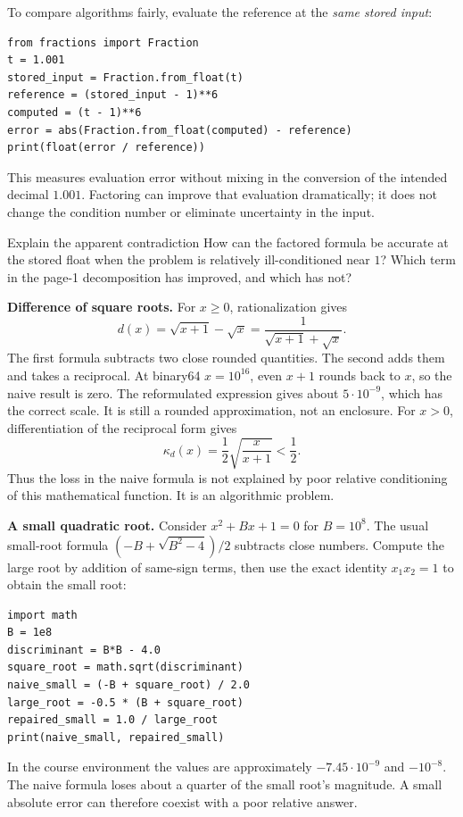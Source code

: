 To compare algorithms fairly, evaluate the reference at the \emph{same stored input}:
\begin{lstlisting}
from fractions import Fraction
t = 1.001
stored_input = Fraction.from_float(t)
reference = (stored_input - 1)**6
computed = (t - 1)**6
error = abs(Fraction.from_float(computed) - reference)
print(float(error / reference))
\end{lstlisting}
This measures evaluation error without mixing in the conversion of the intended
decimal $1.001$. Factoring can improve that evaluation dramatically; it does not
change the condition number or eliminate uncertainty in the input.
\begin{question}{Explain the apparent contradiction}
How can the factored formula be accurate at the stored float when the problem
is relatively ill-conditioned near $1$? Which term in the page-1 decomposition
has improved, and which has not?
\end{question}

\newpage
{}
\textbf{Difference of square roots.} For $x\ge0$, rationalization gives
\[
 d(x)=\sqrt{x+1}-\sqrt x
     =\frac{1}{\sqrt{x+1}+\sqrt x}.
\]
The first formula subtracts two close rounded quantities. The second adds them
and takes a reciprocal. At binary64 $x=10^{16}$, even $x+1$ rounds back to $x$,
so the naive result is zero. The reformulated expression gives about $5\cdot10^{-9}$,
which has the correct scale. It is still a rounded approximation, not an enclosure.
For $x>0$, differentiation of the reciprocal form gives
\[
 \kappa_d(x)=\frac12\sqrt{\frac{x}{x+1}}<\frac12.
\]
Thus the loss in the naive formula is not explained by poor relative conditioning
of this mathematical function. It is an algorithmic problem.

\textbf{A small quadratic root.} Consider $x^2+Bx+1=0$ for $B=10^8$.
The usual small-root formula $(-B+\sqrt{B^2-4})/2$ subtracts close numbers.
Compute the large root by addition of same-sign terms, then use the exact identity
$x_1x_2=1$ to obtain the small root:
\begin{lstlisting}
import math
B = 1e8
discriminant = B*B - 4.0
square_root = math.sqrt(discriminant)
naive_small = (-B + square_root) / 2.0
large_root = -0.5 * (B + square_root)
repaired_small = 1.0 / large_root
print(naive_small, repaired_small)
\end{lstlisting}
In the course environment the values are approximately $-7.45\cdot10^{-9}$
and $-10^{-8}$. The naive formula loses about a quarter of the small root's
magnitude. A small absolute error can therefore coexist with a poor relative answer.

